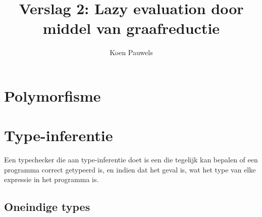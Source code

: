 \documentclass[a4paper,10pt]{article}
\begin{document}
\lstset{language=Haskell}
\title{Verslag 2: Lazy evaluation door middel van graafreductie}
\author{Koen Pauwels}
\maketitle

\section{Polymorfisme}
\section{Type-inferentie}
Een typechecker die aan type-inferentie doet is een die tegelijk kan bepalen of een programma correct getypeerd is, en indien dat het geval is, wat het type van elke expressie in het programma is.

\subsection{Oneindige types}
\end{document}
